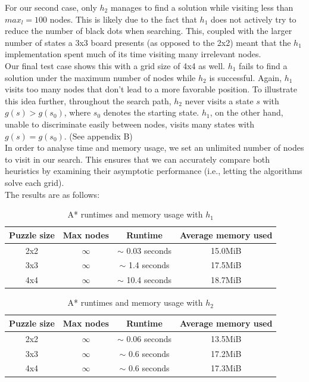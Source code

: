 \documentclass[runningheads]{llncs}
\begin{document}
For our second case, only $h_2$ manages to find a solution while visiting less than $max_l=100$ nodes. This is likely due to the fact that $h_1$ does not actively try to reduce the number of black dots when searching. This, coupled with the larger number of states a 3x3 board presents (as opposed to the 2x2) meant that the $h_1$ implementation spent much of its time visiting many irrelevant nodes. \\

Our final test case shows this with a grid size of 4x4 as well. $h_1$ fails to find a solution under the maximum number of nodes while $h_2$ is successful. Again, $h_1$ visits too many nodes that don't lead to  a more favorable position. To illustrate this idea further, throughout the search path, $h_2$ never visits a state $s$ with $g(s) > g(s_0)$, where $s_0$ denotes the starting state. $h_1$, on the other hand, unable to discriminate easily between nodes, visits many states with $g(s) = g(s_0)$. (See appendix B)  \\

In order to analyse time and memory usage, we set an unlimited number of nodes to visit in our search. This ensures that we can accurately compare both heuristics by examining their asymptotic performance (i.e., letting the algorithms solve each grid). \\

The results are as follows:

\begin{table}
    \centering
    \caption{A* runtimes and memory usage with $h_1$}\label{tab1}
    \begin{tabular}{|c|c|c|c|}
        \hline
        \textbf{Puzzle size} & \textbf{Max nodes} & \textbf{Runtime} & \textbf{Average memory used} \\
        \hline
        2x2 & $\infty$ & $\sim$ 0.03 seconds & 15.0MiB \\ \hline
        3x3 & $\infty$ & $\sim$ 1.4 seconds & 17.5MiB \\ \hline
        4x4 & $\infty$ & $\sim$ 10.4 seconds & 18.7MiB \\ \hline
    \end{tabular}
\end{table}

\begin{table}
    \centering
    \caption{A* runtimes and memory usage with $h_2$}\label{tab2}
    \begin{tabular}{|c|c|c|c|}
        \hline
        \textbf{Puzzle size} & \textbf{Max nodes} & \textbf{Runtime} & \textbf{Average memory used} \\
        \hline
        2x2 & $\infty$ & $\sim$ 0.06 seconds & 13.5MiB \\ \hline
        3x3 & $\infty$ & $\sim$ 0.6 seconds & 17.2MiB \\ \hline
        4x4 & $\infty$ & $\sim$ 0.6 seconds & 17.3MiB \\ \hline
    \end{tabular}
\end{table}
\end{document}
